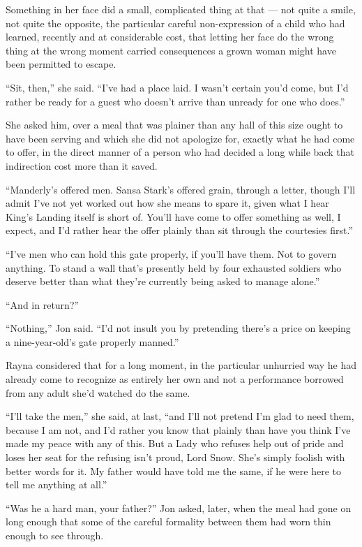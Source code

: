 Something in her face did a small, complicated thing at that — not quite a smile, not quite the opposite, the particular careful non-expression of a child who had learned, recently and at considerable cost, that letting her face do the wrong thing at the wrong moment carried consequences a grown woman might have been permitted to escape.

“Sit, then,” she said. “I’ve had a place laid. I wasn’t certain you’d come, but I’d rather be ready for a guest who doesn’t arrive than unready for one who does.”

\sceneBreak

She asked him, over a meal that was plainer than any hall of this size ought to have been serving and which she did not apologize for, exactly what he had come to offer, in the direct manner of a person who had decided a long while back that indirection cost more than it saved.

“Manderly’s offered men. Sansa Stark’s offered grain, through a letter, though I’ll admit I’ve not yet worked out how she means to spare it, given what I hear King’s Landing itself is short of. You’ll have come to offer something as well, I expect, and I’d rather hear the offer plainly than sit through the courtesies first.”

“I’ve men who can hold this gate properly, if you’ll have them. Not to govern anything. To stand a wall that’s presently held by four exhausted soldiers who deserve better than what they’re currently being asked to manage alone.”

“And in return?”

“Nothing,” Jon said. “I’d not insult you by pretending there’s a price on keeping a nine-year-old’s gate properly manned.”

Rayna considered that for a long moment, in the particular unhurried way he had already come to recognize as entirely her own and not a performance borrowed from any adult she’d watched do the same.

“I’ll take the men,” she said, at last, “and I’ll not pretend I’m glad to need them, because I am not, and I’d rather you know that plainly than have you think I’ve made my peace with any of this. But a Lady who refuses help out of pride and loses her seat for the refusing isn’t proud, Lord Snow. She’s simply foolish with better words for it. My father would have told me the same, if he were here to tell me anything at all.”

\sceneBreak

“Was he a hard man, your father?” Jon asked, later, when the meal had gone on long enough that some of the careful formality between them had worn thin enough to see through.

